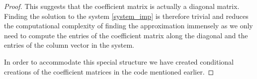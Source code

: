 \begin{proof}
  This suggests that the coefficient matrix is actually a diagonal matrix. Finding
  the solution to the system \eqref{system_imp} is therefore trivial and reduces
  the computational complexity of finding the approximation immensely as we only need
  to compute the entries of the coefficient matrix along the diagonal and the entries
  of the column vector in the system.

  In order to accommodate this special structure we have created conditional creations
  of the coefficient matrices in the code mentioned earlier.
\end{proof}
